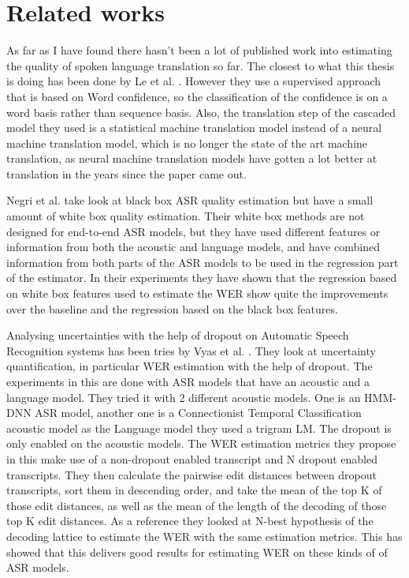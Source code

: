 
\chapter{Related works}
\label{ch:relatecworks}
As far as I have found there hasn't been a lot of published work into estimating the quality of spoken language translation so far. The closest to what this thesis is doing has been done by Le et al. \cite{le2016automatic}. 
However they use a supervised approach that is based on Word confidence, so the classification of the confidence is on a word basis rather than sequence basis. Also, the translation step of the cascaded model they used is a statistical machine translation model instead of a neural machine translation model, which is no longer the state of the art machine translation, as neural machine translation models have gotten a lot better at translation in the years since the paper came out. 

Negri et al.\cite{negri-etal-2014-quality} take look at black box ASR quality estimation but have a small amount of white box quality estimation. Their white box methods are not designed for end-to-end ASR models, but they have used different features or information from both the acoustic and language models, and have combined information from both parts of the ASR models to be used in the regression part of the estimator. In their experiments they have shown that the regression based on white box features used to estimate the WER show quite the improvements over the baseline and the regression based on the black box features. 

Analysing uncertainties with the help of dropout on Automatic Speech Recognition systems has been tries by Vyas et al. \cite{8683086}. They look at uncertainty quantification, in particular WER estimation with the help of dropout. The experiments in this are done with ASR models that have an acoustic and a language model. They tried it with 2 different acoustic models. One is an HMM-DNN ASR model, another one is a Connectionist Temporal Classification acoustic model as the Language model they used a trigram LM. The dropout is only enabled on the acoustic models. 
The WER estimation metrics they propose in this make use of a non-dropout enabled transcript and N dropout enabled transcripts. They then calculate the pairwise edit distances between dropout transcripts, sort them in descending order, and take the mean of the top K of those edit distances, as well as the mean of the length of the decoding of those top K edit distances. As a reference they looked at N-best hypothesis of the decoding lattice to estimate the WER with the same estimation metrics. This has showed that this delivers good results for estimating WER on these kinds of of ASR models. 

